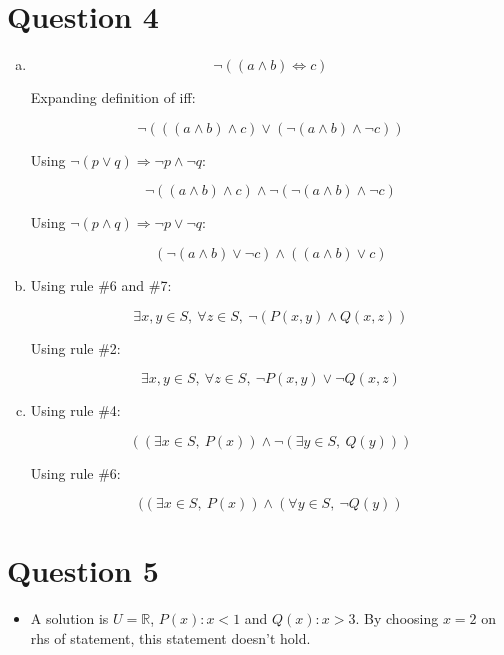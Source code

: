 \documentclass[12pt]{article}
\begin{document}
\section*{Question 4}
    \begin{enumerate}[a)]
        \item
        \begin{equation}
            \neg ((a \land b) \Leftrightarrow c)
        \end{equation}

        Expanding definition of iff:

        \begin{equation}
            \neg (((a\land b) \land c) \lor (\neg (a \land b) \land \neg c))
        \end{equation}

        Using $\neg(p \lor q) \Rightarrow \neg p \land \neg q$:

        \begin{equation}
            \neg((a\land b) \land c) \land \neg (\neg (a \land b) \land \neg c)
        \end{equation}

        Using $\neg(p \land q) \Rightarrow \neg p \lor \neg q$:

        \begin{equation}
            (\neg(a\land b) \lor \neg c) \land ((a \land b) \lor c)
        \end{equation}

        \item
        Using rule \#6 and \#7:

        \setcounter{equation}{0}
        \begin{equation}
            \exists x,y \in S,\: \forall z \in S,\:\neg (P(x,y) \land Q(x,z))
        \end{equation}

        Using rule \#2:

        \begin{equation}
            \exists x,y \in S,\: \forall z \in S,\:\neg P(x,y) \lor \neg Q(x,z)
        \end{equation}

        \item
        Using rule \#4:

        \setcounter{equation}{0}
        \begin{equation}
            ((\exists x \in S,\:P(x)) \land \neg (\exists y \in S,\:Q(y)))
        \end{equation}

        Using rule \#6:

        \begin{equation}
            ((\exists x \in S,\:P(x)) \land (\forall y \in S,\:\neg Q(y))
        \end{equation}

    \end{enumerate}

\section*{Question 5}
    \begin{itemize}
        \item
        A solution is $U = \mathbb{R}$, $P(x): x < 1$ and $Q(x): x > 3$. By choosing $x = 2$ on rhs of statement, this statement doesn't hold.
    \end{itemize}
\end{document}
